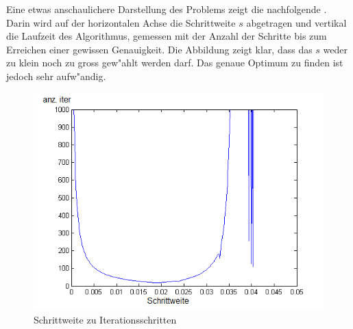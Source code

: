 Eine etwas anschaulichere Darstellung des Problems zeigt die nachfolgende
.
Darin wird auf der horizontalen Achse die Schrittweite $s$ abgetragen und
vertikal die Laufzeit des Algorithmus, gemessen mit der Anzahl der
Schritte bis zum Erreichen einer gewissen Genauigkeit.
Die Abbildung zeigt klar, dass das $s$ weder zu klein noch zu gross gew"ahlt
werden darf. Das genaue Optimum zu finden ist jedoch sehr aufw"andig.

\begin{figure}
\centering
\includegraphics[height=0.6\textwidth]{descent/step.png}
\caption{Schrittweite zu Iterationsschritten}
\label{step}
\end{figure}
